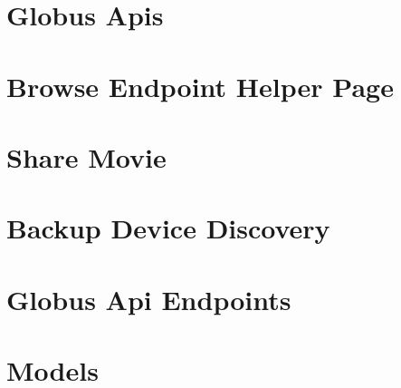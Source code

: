 \chapter{Globus Apis\label{appendix:globusapis}}

\chapter{Browse Endpoint Helper Page\label{appendix:browseendpointhelperpage}}

\chapter{Share Movie\label{appendix:sharemovie}}

\chapter{Backup Device Discovery\label{appendix:backupdevicediscovery}}

\chapter{Globus Api Endpoints\label{appendix:globusapiendpoints}}

\chapter{Models\label{appendix:models}}

